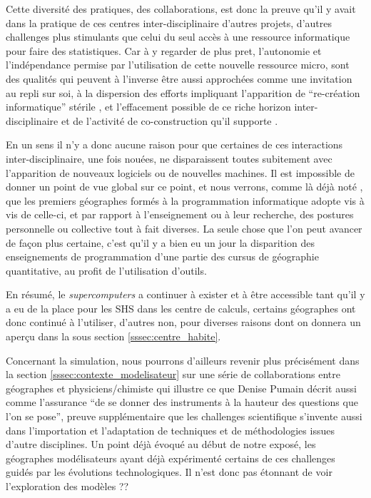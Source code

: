 Cette diversité des pratiques, des collaborations, est donc la preuve qu'il y avait dans la pratique de ces centres inter-disciplinaire d'autres projets, d'autres challenges plus stimulants que celui du seul accès à une ressource informatique pour faire des statistiques. Car à y regarder de plus pret, l'autonomie et l'indépendance permise par l'utilisation de cette nouvelle ressource micro, sont des qualités qui peuvent à l'inverse être aussi approchées comme une invitation au repli sur soi, à la dispersion des efforts impliquant l'apparition de \enquote{re-création informatique} stérile , et l'effacement possible de ce riche horizon inter-disciplinaire et de l'activité de co-construction qu'il supporte \autocite{Banos2013}.

En un sens il n'y a donc aucune raison pour que certaines de ces interactions inter-disciplinaire, une fois nouées, ne disparaissent toutes subitement avec l'apparition de nouveaux logiciels ou de nouvelles machines. Il est impossible de donner un point de vue global sur ce point, et nous verrons, comme là déjà noté \autocite[372]{Cuyala2014}, que les premiers géographes formés à la programmation informatique adopte vis à vis de celle-ci, et par rapport à l'enseignement ou à leur recherche, des postures personnelle ou collective tout à fait diverses. La seule chose que l'on peut avancer de façon plus certaine, c'est qu'il y a bien eu un jour la disparition des enseignements de programmation d'une partie des cursus de géographie quantitative, au profit de l'utilisation d'outils.

En résumé, le \textit{supercomputers} a continuer à exister et à être accessible tant qu'il y a eu de la place pour les SHS dans les centre de calculs, certains géographes ont donc continué à l'utiliser, d'autres non, pour diverses raisons dont on donnera un aperçu dans la sous section \ref{sssec:centre_habite}.


Concernant la simulation, nous pourrons d'ailleurs revenir plus précisément dans la section \ref{sssec:contexte_modelisateur} sur une série de collaborations entre géographes et physiciens/chimiste qui illustre ce que Denise Pumain décrit aussi comme l'assurance \enquote{de se donner des instruments à la hauteur des questions que l'on se pose}, preuve supplémentaire que les challenges scientifique s'invente aussi dans l'importation et l'adaptation de techniques et de méthodologies issues d'autre disciplines. Un point déjà évoqué au début de notre exposé, les géographes modélisateurs ayant déjà expérimenté certains de ces challenges guidés par les évolutions technologiques. Il n'est donc pas étonnant de voir l'exploration des modèles ??

